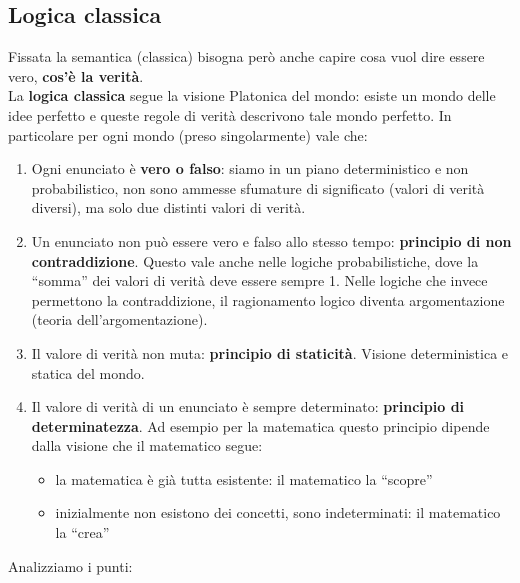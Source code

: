\documentclass[
  a4paper,
]{article}
\providecommand{\tightlist}{%
  \setlength{\itemsep}{0pt}\setlength{\parskip}{0pt}}
\begin{document}
\hypertarget{logica-classica}{%
\subsection{Logica classica}\label{logica-classica}}

Fissata la semantica (classica) bisogna però anche capire cosa vuol dire
essere vero, \textbf{cos'è la verità}.\\
La \textbf{logica classica} segue la visione Platonica del mondo: esiste
un mondo delle idee perfetto e queste regole di verità descrivono tale
mondo perfetto. In particolare per ogni mondo (preso singolarmente) vale
che:

\begin{enumerate}
\def\labelenumi{\arabic{enumi}.}
\item
  Ogni enunciato è \textbf{vero o falso}: siamo in un piano
  deterministico e non probabilistico, non sono ammesse sfumature di
  significato (valori di verità diversi), ma solo due distinti valori di
  verità.
\item
  Un enunciato non può essere vero e falso allo stesso tempo:
  \textbf{principio di non contraddizione}. Questo vale anche nelle
  logiche probabilistiche, dove la ``somma'' dei valori di verità deve
  essere sempre 1. Nelle logiche che invece permettono la
  contraddizione, il ragionamento logico diventa argomentazione (teoria
  dell'argomentazione).
\item
  Il valore di verità non muta: \textbf{principio di staticità}. Visione
  deterministica e statica del mondo.
\item
  Il valore di verità di un enunciato è sempre determinato:
  \textbf{principio di determinatezza}. Ad esempio per la matematica
  questo principio dipende dalla visione che il matematico segue:

  \begin{itemize}
  \tightlist
  \item
    la matematica è già tutta esistente: il matematico la ``scopre''
  \item
    inizialmente non esistono dei concetti, sono indeterminati: il
    matematico la ``crea''
  \end{itemize}
\end{enumerate}

Analizziamo i punti:
\end{document}
